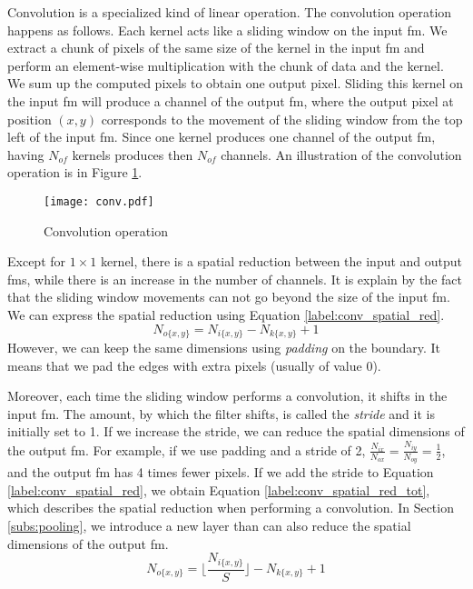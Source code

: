 Convolution is a specialized kind of linear operation. The convolution operation happens as follows. Each kernel acts like a sliding window on the input \acrshort{fm}. We extract a chunk of pixels of the same size of the kernel in the input \acrshort{fm} and perform an element-wise multiplication with the chunk of data and the kernel. We sum up the computed pixels to obtain one output pixel. Sliding this kernel on the input \acrshort{fm} will produce a channel of the output \acrshort{fm}, where the output pixel at position $(x, y)$ corresponds to the movement of the sliding window from the top left of the input \acrshort{fm}. Since one kernel produces one channel of the output \acrshort{fm}, having $N_{of}$ kernels produces then $N_{of}$ channels. An illustration of the convolution operation is in Figure \ref{fig:convolution}.
%
\begin{figure}
    \centering
    \texttt{[image: conv.pdf]}
    \caption{Convolution operation}
    \label{fig:convolution}
\end{figure}

Except for $1 \times 1$ kernel, there is a spatial reduction between the input and output \acrshort{fm}s, while there is an increase in the number of channels. It is explain by the fact that the sliding window movements can not go beyond the size of the input \acrshort{fm}. We can express the spatial reduction using Equation \eqref{label:conv_spatial_red}.
%
\begin{equation}
    N_{o\{x,y\}} = N_{i\{x,y\}} - N_{k\{x,y\}} + 1
    \label{label:conv_spatial_red}
\end{equation}
%
However, we can keep the same dimensions using \textit{padding} on the boundary. It means that we pad the edges with extra pixels (usually of value 0).

Moreover, each time the sliding window performs a convolution, it shifts in the input \acrshort{fm}. The amount, by which the filter shifts, is called the \textit{stride} and it is initially set to 1. If we increase the stride, we can reduce the spatial dimensions of the output \acrshort{fm}. For example, if we use padding and a stride of 2, $\frac{N_{ix}}{N_{ox}} = \frac{N_{iy}}{N_{oy}} = \frac{1}{2}$, and the output \acrshort{fm} has 4 times fewer pixels. If we add the stride to Equation \eqref{label:conv_spatial_red}, we obtain Equation \eqref{label:conv_spatial_red_tot}, which describes the spatial reduction when performing a convolution. In Section \ref{subs:pooling}, we introduce a new layer than can also reduce the spatial dimensions of the output \acrshort{fm}.
%
\begin{equation}
    N_{o\{x,y\}} = \lfloor \frac{ N_{i\{x,y\}}}{S} \rfloor - N_{k\{x,y\}} + 1
    \label{label:conv_spatial_red_tot}
\end{equation}

